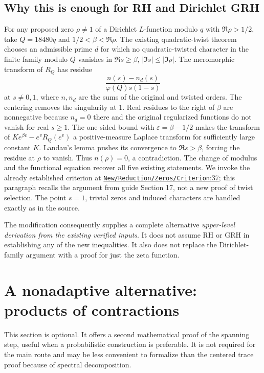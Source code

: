 \documentclass[11pt]{article}
\theoremstyle{remark}\newtheorem{remark}[theorem]{Remark}
\newcommand{\src}[2]{\href{https://github.com/lsernau/grh-lean/blob/72fead102f663d5c7a407964a13dc0cf9d977207/grh/src/#1.lean\#L#2}{\nolinkurl{#1}:#2}}
\begin{document}
\subsection{Why this is enough for RH and Dirichlet GRH}
For any proposed zero $\rho\ne1$ of a Dirichlet $L$-function modulo $q$ with $\Re\rho>1/2$, take $Q=18480q$ and $1/2<\beta<\Re\rho$. The existing quadratic-twist theorem chooses an admissible prime $d$ for which no quadratic-twisted character in the finite family modulo $Q$ vanishes in $\Re s\ge\beta$, $|\Im s|\le|\Im\rho|$. The meromorphic transform of $R_Q$ has residue
\[
\frac{n(s)-n_d(s)}{\varphi(Q)s(1-s)}
\]
at $s\ne0,1$, where $n,n_d$ are the sums of the original and twisted orders. The centering removes the singularity at $1$. Real residues to the right of $\beta$ are nonnegative because $n_d=0$ there and the original regularized functions do not vanish for real $s\ge1$. The one-sided bound with $\varepsilon=\beta-1/2$ makes the transform of $K e^{\beta v}-e^v R_Q(e^v)$ a positive-measure Laplace transform for sufficiently large constant $K$. Landau's lemma pushes its convergence to $\Re s>\beta$, forcing the residue at $\rho$ to vanish. Thus $n(\rho)=0$, a contradiction. The change of modulus and the functional equation recover all five existing statements. We invoke the already established criterion at \src{New/Reduction/Zeros/Criterion}{37}; this paragraph recalls the argument from guide Section 17, not a new proof of twist selection. The point $s=1$, trivial zeros and induced characters are handled exactly as in the source.

The modification consequently supplies a complete alternative \emph{upper-level derivation from the existing verified inputs}. It does not assume RH or GRH in establishing any of the new inequalities. It also does not replace the Dirichlet-family argument with a proof for just the zeta function.

\section{A nonadaptive alternative: products of contractions}
This section is optional. It offers a second mathematical proof of the spanning step, useful when a probabilistic construction is preferable. It is not required for the main route and may be less convenient to formalize than the centered trace proof because of spectral decomposition.
\end{document}
